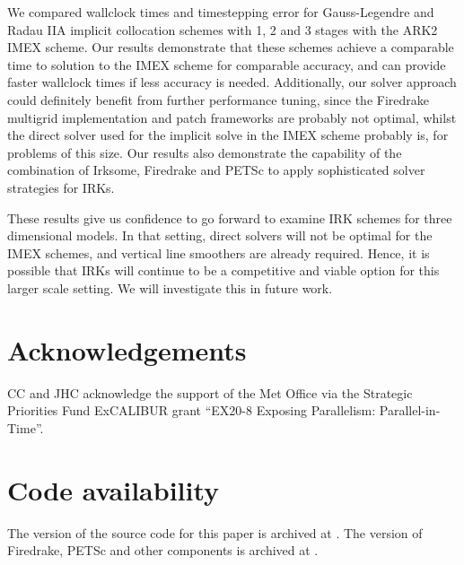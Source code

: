 \documentclass[a4paper, 12pt]{article}
\newcommand{\revisedB}[1]{#1}
\newcommand{\revisedus}[1]{#1}
\begin{document}
  We compared wallclock times and timestepping error
  for Gauss-Legendre and Radau IIA implicit collocation schemes with
  1, 2 and 3 stages with the ARK2 IMEX scheme. Our results demonstrate
  that these schemes \revisedus{achieve a comparable time to solution
    to the IMEX scheme for comparable accuracy}, and can provide faster
  wallclock times if less accuracy is needed. Additionally, our solver
  approach could definitely benefit from further performance tuning,
  since the Firedrake multigrid \revisedus{implementation} and patch
  frameworks are probably not optimal, whilst the direct solver used
  for the implicit solve in the IMEX scheme probably is\revisedus{,
    for problems of this size}. Our results also demonstrate the
  capability of the combination of Irksome, Firedrake and PETSc to
  apply sophisticated solver strategies for IRKs.

These results give us confidence to go forward to examine IRK schemes
for three dimensional models. In that setting, direct solvers will not
be optimal for the IMEX schemes, and vertical line smoothers are
already required.
\revisedus{Hence, it is possible that IRKs will continue to be
  a competitive and viable option for} this larger scale setting.
We will investigate this in future work.

\section*{Acknowledgements}
CC \revisedus{and JHC} acknowledge the support of the Met Office via the Strategic Priorities Fund ExCALIBUR grant ``EX20-8 Exposing Parallelism: Parallel-in-Time''.

\section*{Code availability}
\revisedB{The version of the source code for this paper is archived at
\citet{colin_j_cotter_2026_20817145}. The version of Firedrake, PETSc
and other components is archived at
\citet{firedrake_zenodo_2026_20814010}.}


\end{document}
